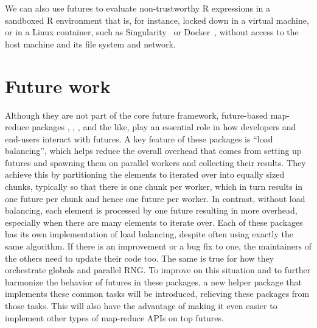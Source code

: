 We can also use futures to evaluate non-trustworthy R expressions in a
sandboxed R environment that is, for instance, locked down in a
virtual machine, or in a Linux container, such as
Singularity~\citep{Kurtzer2017} or Docker~\citep{Merkel2014}, without
access to the host machine and its file system and network.



\section{Future work}
\label{future-work}

Although they are not part of the core future framework, future-based
map-reduce packages , , ,
and the like, play an essential role in how developers and end-users
interact with futures.  A key feature of these packages is ``load
balancing'', which helps reduce the overall overhead that comes from
setting up futures and spawning them on parallel workers and
collecting their results.  They achieve this by partitioning the
elements to iterated over into equally sized chunks, typically so that
there is one chunk per worker, which in turn results in one future per
chunk and hence one future per worker.  In contrast, without load
balancing, each element is processed by one future resulting in more
overhead, especially when there are many elements to iterate over.
Each of these packages has its own implementation of load balancing,
despite often using exactly the same algorithm.  If there is an
improvement or a bug fix to one, the maintainers of the others need to
update their code too.  The same is true for how they orchestrate
globals and parallel RNG.  To improve on this situation and to further
harmonize the behavior of futures in these packages, a new helper
package  that implements these common tasks will
be introduced, relieving these packages from those tasks.  This will
also have the advantage of making it even easier to implement other
types of map-reduce APIs on top futures.

